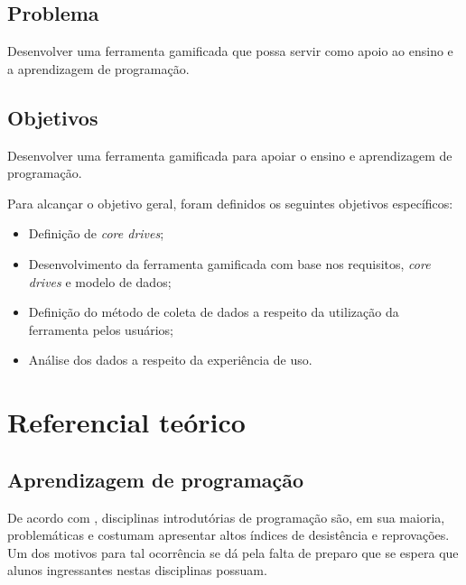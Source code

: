 \section{Problema}
Desenvolver uma ferramenta gamificada que possa servir como apoio ao ensino e a aprendizagem de programação.
 
\section{Objetivos}
Desenvolver uma ferramenta gamificada para apoiar o ensino e aprendizagem de programação.


Para alcançar o objetivo geral, foram definidos os seguintes objetivos específicos:
\begin{itemize}
	\item Definição de \textit{core drives};
	\item Desenvolvimento da ferramenta gamificada com base nos requisitos, \textit{core drives} e modelo de dados;
	\item Definição do método de coleta de dados a respeito da utilização da ferramenta pelos usuários;
	\item Análise dos dados a respeito da experiência de uso.
\end{itemize}

\chapter{Referencial teórico}

\section{Aprendizagem de programação}
De acordo com , disciplinas introdutórias de programação são, em sua maioria, problemáticas e costumam apresentar
altos índices de desistência e reprovações. Um dos motivos para tal ocorrência se dá pela falta de preparo que se espera que alunos
ingressantes nestas disciplinas possuam.

